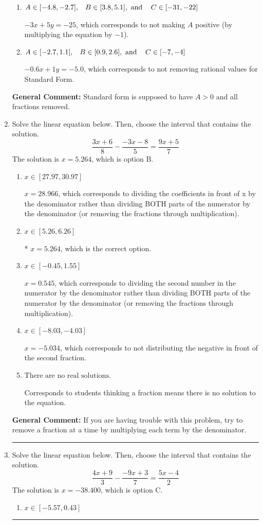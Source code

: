 \documentclass{extbook}[14pt]
\newcommand{\litem}[1]{\item #1

\rule{\textwidth}{0.4pt}}
\begin{document}
\begin{enumerate}
{\begin{enumerate}[label=\Alph*.]
* $3x - 5y = 25$, which is the correct option.
\item \( A \in [-4.8, -2.7], \hspace{3mm} B \in [3.8, 5.1], \text{ and } \hspace{3mm} C \in [-31, -22] \)

 $-3x + 5y = -25$, which corresponds to not making $A$ positive (by multiplying the equation by $-1$).
\item \( A \in [-2.7, 1.1], \hspace{3mm} B \in [0.9, 2.6], \text{ and } \hspace{3mm} C \in [-7, -4] \)

 $-0.6x + 1y = -5.0$, which corresponds to not removing rational values for Standard Form.
\end{enumerate}

\textbf{General Comment:} Standard form is supposed to have $A > 0$ and all fractions removed.
}
\litem{
Solve the linear equation below. Then, choose the interval that contains the solution.
\[ \frac{3x + 6}{8} - \frac{-3x -8}{5} = \frac{9x + 5}{7} \]The solution is \( x = 5.264 \), which is option B.\begin{enumerate}[label=\Alph*.]
\item \( x \in [27.97, 30.97] \)

 $x = 28.966$, which corresponds to dividing the coefficients in front of x by the denominator rather than dividing BOTH parts of the numerator by the denominator (or removing the fractions through multiplication).
\item \( x \in [5.26, 6.26] \)

* $x = 5.264$, which is the correct option.
\item \( x \in [-0.45, 1.55] \)

 $x = 0.545$, which corresponds to dividing the second number in the numerator by the denominator rather than dividing BOTH parts of the numerator by the denominator (or removing the fractions through multiplication).
\item \( x \in [-8.03, -4.03] \)

 $x = -5.034$, which corresponds to not distributing the negative in front of the second fraction.
\item \( \text{There are no real solutions.} \)

Corresponds to students thinking a fraction means there is no solution to the equation.
\end{enumerate}

\textbf{General Comment:} If you are having trouble with this problem, try to remove a fraction at a time by multiplying each term by the denominator.
}
\litem{
Solve the linear equation below. Then, choose the interval that contains the solution.
\[ \frac{4x + 9}{3} - \frac{-9x + 3}{7} = \frac{5x -4}{2} \]The solution is \( x = -38.400 \), which is option C.\begin{enumerate}[label=\Alph*.]
\item \( x \in [-5.57, 0.43] \)


\end{enumerate}}
\end{enumerate}
\end{document}
